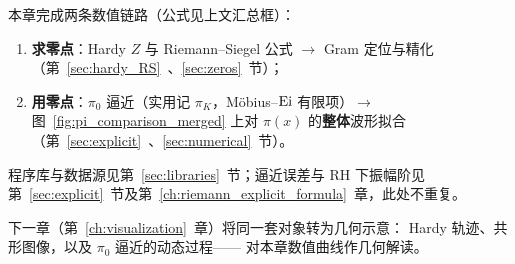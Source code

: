 本章完成两条数值链路（公式见上文汇总框）：
\begin{enumerate}
  \item \textbf{求零点}：Hardy $Z$ 与 Riemann--Siegel 公式 $\to$ Gram 定位与精化
        （第~\ref{sec:hardy_RS}~、\ref{sec:zeros}~节）；
  \item \textbf{用零点}：$\pi_0$ 逼近（实用记 $\pi_K$，Möbius--$\operatorname{Ei}$ 有限项）$\to$
        图~\ref{fig:pi_comparison_merged} 上对 $\pi(x)$ 的\textbf{整体}波形拟合
        （第~\ref{sec:explicit}~、\ref{sec:numerical}~节）。
\end{enumerate}
程序库与数据源见第~\ref{sec:libraries}~节；逼近误差与 RH 下振幅阶见第~\ref{sec:explicit}~节及第~\ref{ch:riemann_explicit_formula}~章，此处不重复。

下一章（第~\ref{ch:visualization}~章）将同一套对象转为几何示意：
Hardy 轨迹、共形图像，以及 $\pi_0$ 逼近的动态过程——
对本章数值曲线作几何解读。
